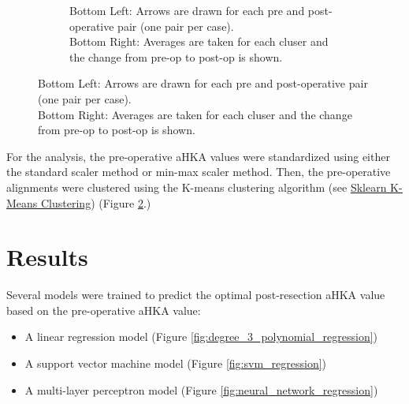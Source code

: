 \documentclass{article}
\begin{document}
\begin{figure}[ht]
\begin{subfigure}[rt]{.58\textwidth}
		\caption{%
			\footnotesize
			Bottom Left: Arrows are drawn for each pre and post-operative pair (one pair per case).\\
			Bottom Right: Averages are taken for each cluser and the change from pre-op to post-op is shown.
			}
		\label{fig:clusters}
	\end{subfigure}
\end{figure}



For the analysis, the pre-operative aHKA values were standardized using either the standard scaler method or min-max scaler method.
Then, the pre-operative alignments were clustered using the K-means clustering algorithm
(see \href{https://scikit-learn.org/stable/modules/generated/sklearn.cluster.KMeans.html#sklearn.cluster.KMeans}
{\underline{Sklearn K-Means Clustering}}) (Figure \ref{fig:clusters}.)\\

\section{Results} %

Several models were trained to predict the optimal post-resection aHKA value based on the pre-operative aHKA value:
\begin{itemize}
	\item A linear regression model (Figure \ref{fig:degree_3_polynomial_regression})
	\item A support vector machine model (Figure \ref{fig:svm_regression})
	\item A multi-layer perceptron model (Figure \ref{fig:neural_network_regression})
\end{itemize}
\end{document}
